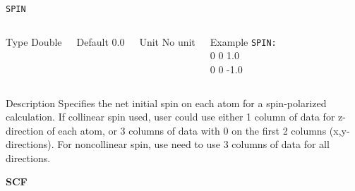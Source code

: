 \documentclass[xcolor=dvipsnames,t]{beamer}
\begin{document}
\begin{frame}[allowframebreaks]{\texttt{SPIN}} \label{SPIN}
\vspace*{-12pt}
\begin{columns}
\begin{block}{Type}
Double
\end{block}

\begin{block}{Default}
0.0
\end{block}

\begin{block}{Unit}
No unit
\end{block}

\begin{block}{Example}
\texttt{SPIN: \\}
0 0 1.0 \\
0 0 -1.0
\end{block}
\end{columns}

\begin{block}{Description}
Specifies the net initial spin on each atom for a spin-polarized calculation. If collinear spin used, user could use either 1 column of data for z-direction of each atom, or 3 columns of data with 0 on the first 2 columns (x,y-directions). For noncollinear spin, use need to use 3 columns of data for all directions. 
\end{block}

\end{frame}


\begin{frame}[allowframebreaks,c]{} \label{SCF}

\begin{center}
\Huge \textbf{SCF}
\end{center}

\end{frame}
\end{document}
